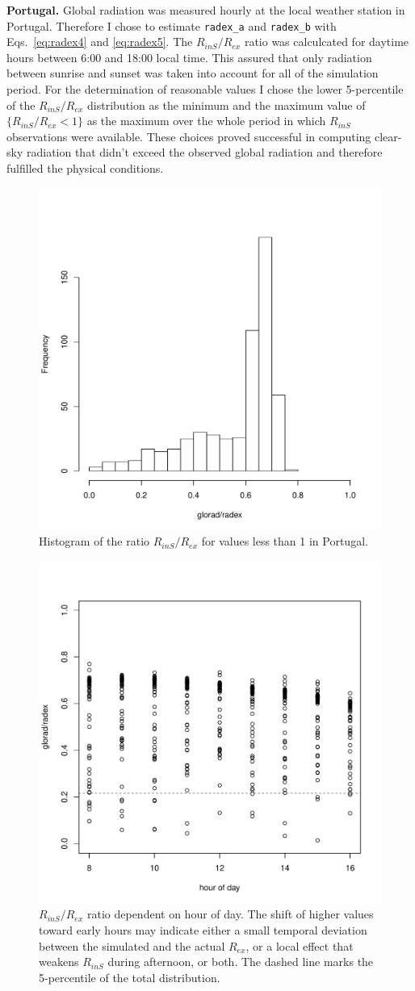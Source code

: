 \documentclass{scrreprt}
\begin{document}
\textbf{Portugal.}
Global radiation was measured hourly at the local weather station in Portugal.
Therefore I chose to estimate \verb!radex_a! and \verb!radex_b! with Eqs.~\eqref{eq:radex4} and \eqref{eq:radex5}.
The $R_{inS}/R_{ex}$ ratio was calculcated for daytime hours between 6:00 and 18:00 local time.
This assured that only radiation between sunrise and sunset was taken into account for all of the simulation period.
For the determination of reasonable values I chose the lower 5-percentile of the $R_{inS}/R_{ex}$ distribution as the minimum and the maximum value of $\{R_{inS}/R_{ex} < 1\}$ as the maximum over the whole period in which $R_{inS}$ observations were available.
These choices proved successful in computing clear-sky radiation that didn't exceed the observed global radiation and therefore fulfilled the physical conditions.

\begin{figure}[ht]
  \centering
  \includegraphics[width=0.5\hsize]{./plot_radex1.pdf}
  \caption{Histogram of the ratio $R_{inS}/R_{ex}$ for values less than 1 in Portugal.}
  \label{fig:portugal_radex1}
\end{figure}

\begin{figure}[ht]
  \centering
  \includegraphics[width=0.6\hsize]{./plot_radex2.pdf}
  \caption{$R_{inS}/R_{ex}$ ratio dependent on hour of day.
           The shift of higher values toward early hours may indicate either a small temporal deviation between the simulated and the actual $R_{ex}$, or a local effect that weakens $R_{inS}$ during afternoon, or both.
           The dashed line marks the 5-percentile of the total distribution.}
  \label{fig:portugal_radex2}
\end{figure}
\end{document}
